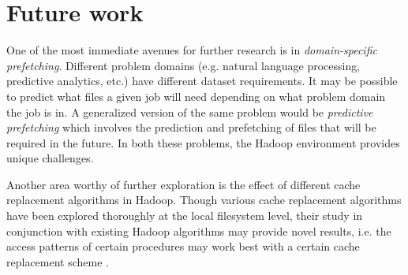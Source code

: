 \documentclass[12pt]{article}
\begin{document}
\section{Future work}
One of the most immediate avenues for further research is in \textit{domain-specific prefetching}. Different problem domains (e.g. natural language processing, predictive analytics, etc.) have different dataset requirements. It may be possible to predict what files a given job will need depending
on what problem domain the job is in. A generalized version of the same problem would be \textit{predictive prefetching} \cite{griffioen1994reducing} which involves the prediction and prefetching of files that will be required in the future. In both these problems, the Hadoop environment provides unique
challenges.


Another area worthy of further exploration is the effect of different cache replacement algorithms in Hadoop. Though various cache replacement algorithms
have been explored thoroughly at the local filesystem level, their study 
in conjunction with existing Hadoop algorithms may provide novel results, i.e.
the access patterns of certain procedures may work best with a certain
cache replacement scheme \cite{puzak1985analysis}.

\nocite{*}



\end{document}
